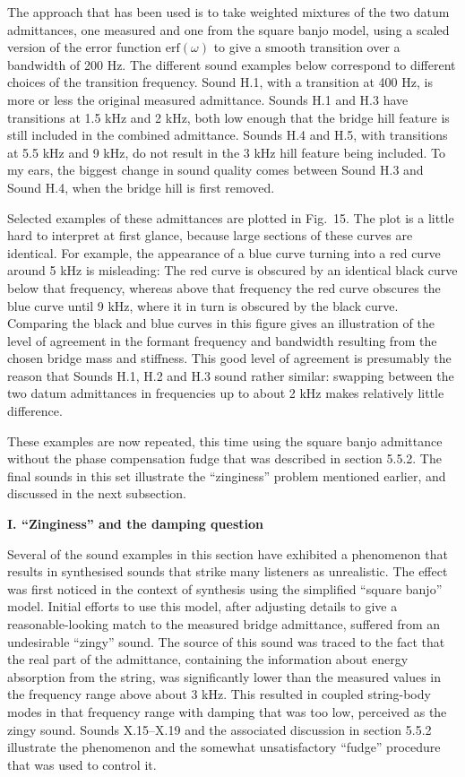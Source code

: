   The approach that has been used is to take weighted mixtures of the two datum 
  admittances, one measured and one from the square banjo model, using a scaled 
  version of the error function $\mathrm{erf}(\omega)$ to give a smooth 
  transition over a bandwidth of 200 Hz. The different sound examples below 
  correspond to different choices of the transition frequency. Sound H.1, with 
  a transition at 400 Hz, is more or less the original measured admittance. 
  Sounds H.1 and H.3 have transitions at 1.5 kHz and 2 kHz, both low enough 
  that the bridge hill feature is still included in the combined admittance. 
  Sounds H.4 and H.5, with transitions at 5.5 kHz and 9 kHz, do not result in 
  the 3 kHz hill feature being included. To my ears, the biggest change in 
  sound quality comes between Sound H.3 and Sound H.4, when the bridge hill is 
  first removed. 

  Selected examples of these admittances are plotted in Fig.\ 15. The plot is 
  a little hard to interpret at first glance, because large sections of these 
  curves are identical. For example, the appearance of a blue curve turning 
  into a red curve around 5 kHz is misleading: The red curve is obscured by an 
  identical black curve below that frequency, whereas above that frequency the 
  red curve obscures the blue curve until 9 kHz, where it in turn is obscured 
  by the black curve. Comparing the black and blue curves in this figure gives 
  an illustration of the level of agreement in the formant frequency and 
  bandwidth resulting from the chosen bridge mass and stiffness. This good 
  level of agreement is presumably the reason that Sounds H.1, H.2 and H.3 
  sound rather similar: swapping between the two datum admittances in 
  frequencies up to about 2 kHz makes relatively little difference. 

  These examples are now repeated, this time using the square banjo admittance 
  without the phase compensation fudge that was described in section 5.5.2. The 
  final sounds in this set illustrate the ``zinginess'' problem mentioned 
  earlier, and discussed in the next subsection. 

  \textbf{I. ``Zinginess'' and the damping question} 

  Several of the sound examples in this section have exhibited a phenomenon 
  that results in synthesised sounds that strike many listeners as unrealistic. 
  The effect was first noticed in the context of synthesis using the simplified 
  ``square banjo'' model. Initial efforts to use this model, after adjusting 
  details to give a reasonable-looking match to the measured bridge admittance, 
  suffered from an undesirable ``zingy'' sound. The source of this sound was 
  traced to the fact that the real part of the admittance, containing the 
  information about energy absorption from the string, was significantly lower 
  than the measured values in the frequency range above about 3 kHz. This 
  resulted in coupled string-body modes in that frequency range with damping 
  that was too low, perceived as the zingy sound. Sounds X.15--X.19 and the 
  associated discussion in section 5.5.2 illustrate the phenomenon and the 
  somewhat unsatisfactory ``fudge'' procedure that was used to control it. 

